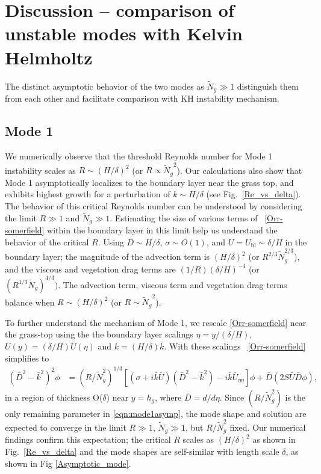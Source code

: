 \documentclass{jfm}
\newcommand{\hg}{h_g}
\renewcommand{\Rey}{{R}}
\newcommand{\Ndg}{\tilde{N}_g}
\newcommand{\ubl}{U_\text{bl}}
\begin{document}
\section{Discussion -- comparison of unstable modes with Kelvin Helmholtz}
The distinct asymptotic behavior of the two modes as $\Ndg \gg 1$ distinguish them from each other and facilitate comparison with KH instability mechanism. 
\subsection{Mode 1}
We numerically observe that the threshold Reynolds number for Mode 1 instability scales as  $\Rey \sim (H/\delta)^2$ (or $\Rey \propto {\Ndg}^{2}$). 
Our calculations also show that Mode 1 asymptotically localizes to the boundary layer near the grass top, and exhibits highest growth for a perturbation of  $k \sim H/\delta$ (see Fig.~\ref{Re_vs_delta}). 
The behavior of this critical Reynolds number can be understood by considering the limit $\Rey \gg 1$ and $\Ndg \gg 1$.
Estimating the size of various terms of ~\eqref{Orr-somerfield} within the boundary layer in this limit help us understand the behavior of the critical $\Rey$. 
Using $D\sim H/\delta$, $\sigma \sim O(1)$, and $U=\ubl \sim \delta/H$ in the boundary layer; the magnitude of the advection term is $ (H/\delta)^2$  (or $\Rey^{2/3} \Ndg^{2/3}$), and the viscous and vegetation drag terms are $(1/\Rey) (\delta/H)^{-4}$ (or $(\Rey^{1/3} \Ndg)^{4/3})$. 
The advection term, viscous term and vegetation drag terms balance when $\Rey \sim (H/\delta)^2$ (or $\Rey \sim {\Ndg}^{2}$).

To further understand the mechanism of Mode 1, we rescale \eqref{Orr-somerfield} near the grass-top using the the boundary layer scalings $\eta = y/(\delta/H)$, 
$U(y) = (\delta/H)\bar{U}(\eta)$ and $k = (H/\delta) \bar{k}$.
With these scalings ~\eqref{Orr-somerfield} simplifies to
\begin{equation}
\begin{split}
\left(\bar{D}^2 -\bar{k}^{2} \right)^2\phi &= (\Rey/\Ndg^2)^{1/3} \left[ \left({\sigma}+i\bar{k}\bar{U}\right) \left(\bar{D}^2-\bar{k}^2\right) -i\bar{k}\bar{U}_{\eta\eta}\right]\phi + \bar{D}\left(2S \bar{U} \bar{D} \phi\right),
\label{eqn:mode1asymp}
\end{split}
\end{equation}
in a region of thickness O($\delta$) near $y=\hg$, where $\bar{D} = d/d\eta$. 
Since $(\Rey/\Ndg^2)$ is the only remaining parameter in \eqref{eqn:mode1asymp}, the mode shape and solution are expected to converge in the limit $\Rey \gg 1$, $\Ndg \gg 1$, but $\Rey/\Ndg^2$ fixed.
Our numerical findings confirm this expectation; the critical $\Rey$ scales as $(H/\delta)^2$ as shown in Fig.~\ref{Re_vs_delta} and the mode shapes are self-similar with length scale $\delta$, as shown in Fig \ref{Asymptotic_mode}. 
\end{document}
